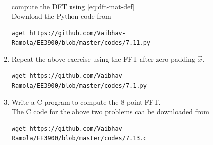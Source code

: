 \documentclass[journal,12pt,twocolumn]{IEEEtran}
\renewcommand\thesection{\arabic{section}}
\begin{document}
\begin{enumerate}[label=\thesection.\arabic*]
\begin{align}
	\label{eq:equation1}
\end{align}
compute the DFT  
using 
\eqref{eq:dft-mat-def}
\\
\solution Download the Python code from 
\begin{lstlisting}
wget https://github.com/Vaibhav-Ramola/EE3900/blob/master/codes/7.11.py
\end{lstlisting}
\item Repeat the above exercise using the FFT
after zero padding $\vec{x}$.
\begin{lstlisting}
wget https://github.com/Vaibhav-Ramola/EE3900/blob/master/codes/7.1.py
\end{lstlisting}
\item Write a C program to compute the 8-point FFT. \\
\solution The C code for the above two problems can be downloaded from
\begin{lstlisting}
wget https://github.com/Vaibhav-Ramola/EE3900/blob/master/codes/7.13.c
\end{lstlisting}
\end{enumerate}
\end{document}
